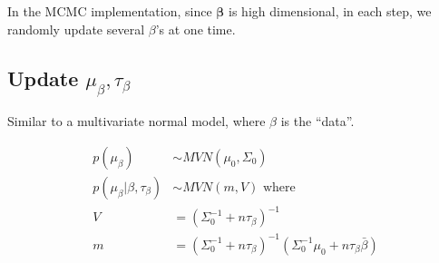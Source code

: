 In the MCMC implementation, since $\bm{\beta}$ is high dimensional, in each
step, we randomly update several $\beta$'s at one time.

\subsection{Update $\mu_{\beta}, \tau_{\beta}$}

Similar to a multivariate normal model, where $\beta$ is the ``data''.

\begin{align}
  p(\mu_{\beta}) &\sim MVN(\mu_0, \Sigma_0) \\
  p(\mu_{\beta} | \beta, \tau_{\beta}) &\sim MVN(m, V) \text{ where } \\
  V &= (\Sigma_0^{-1} + n \tau_{\beta})^{-1} \\
  m &= (\Sigma_0^{-1} + n \tau_{\beta})^{-1} (\Sigma_0^{-1}\mu_0 + n \tau_{\beta} \bar \beta)
\end{align}


